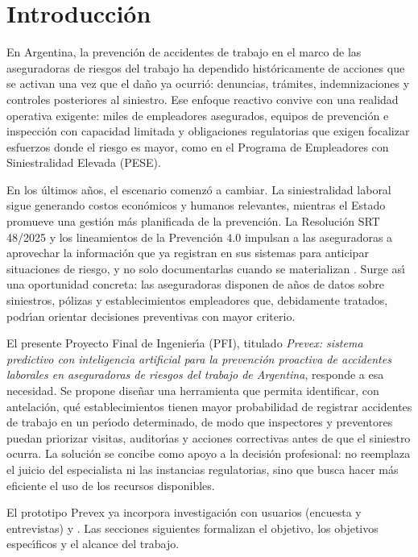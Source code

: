 \chapter{Introducci\'on}\label{ch:introduccion}

En Argentina, la prevenci\'on de accidentes de trabajo en el marco de las aseguradoras de riesgos del trabajo ha dependido hist\'oricamente de acciones que se activan una vez que el da\~no ya ocurri\'o: denuncias, tr\'amites, indemnizaciones y controles posteriores al siniestro. Ese enfoque reactivo convive con una realidad operativa exigente: miles de empleadores asegurados, equipos de prevenci\'on e inspecci\'on con capacidad limitada y obligaciones regulatorias que exigen focalizar esfuerzos donde el riesgo es mayor, como en el Programa de Empleadores con Siniestralidad Elevada (PESE).

En los \'ultimos a\~nos, el escenario comenz\'o a cambiar. La siniestralidad laboral sigue generando costos econ\'omicos y humanos relevantes, mientras el Estado promueve una gesti\'on m\'as planificada de la prevenci\'on. La Resoluci\'on SRT 48/2025 y los lineamientos de la Prevenci\'on 4.0 impulsan a las aseguradoras a aprovechar la informaci\'on que ya registran en sus sistemas para anticipar situaciones de riesgo, y no solo documentarlas cuando se materializan \parencite{srt_res48_2025,srt_prevencion40}. Surge as\'{\i} una oportunidad concreta: las aseguradoras disponen de a\~nos de datos sobre siniestros, p\'olizas y establecimientos empleadores que, debidamente tratados, podr\'{\i}an orientar decisiones preventivas con mayor criterio.

El presente Proyecto Final de Ingenier\'{\i}a (PFI), titulado \emph{Prevex: sistema predictivo con inteligencia artificial para la prevenci\'on proactiva de accidentes laborales en aseguradoras de riesgos del trabajo de Argentina}, responde a esa necesidad. Se propone dise\~nar una herramienta que permita identificar, con antelaci\'on, qu\'e establecimientos tienen mayor probabilidad de registrar accidentes de trabajo en un per\'{\i}odo determinado, de modo que inspectores y preventores puedan priorizar visitas, auditor\'{\i}as y acciones correctivas antes de que el siniestro ocurra. La soluci\'on se concibe como apoyo a la decisi\'on profesional: no reemplaza el juicio del especialista ni las instancias regulatorias, sino que busca hacer m\'as eficiente el uso de los recursos disponibles.

El prototipo Prevex ya incorpora investigaci\'on con usuarios (encuesta y entrevistas) y . Las secciones siguientes formalizan el objetivo, los objetivos espec\'{\i}ficos y el alcance del trabajo.

